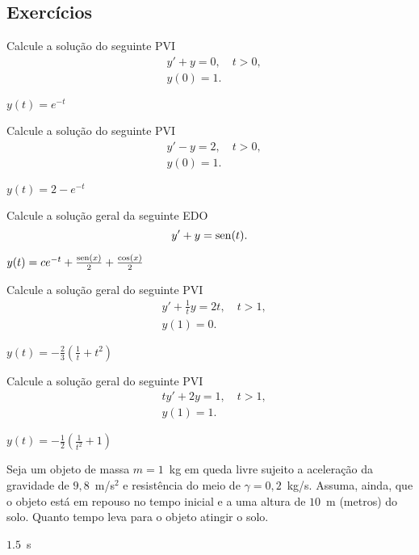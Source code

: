 \subsection*{Exercícios}

\begin{exer}
  Calcule a solução do seguinte PVI
  \begin{align}
    &y' + y = 0, \quad t>0, \\
    &y(0) = 1.    
  \end{align}
\end{exer}
\begin{resp}
  $y(t) = e^{-t}$
\end{resp}

\begin{exer}
  Calcule a solução do seguinte PVI
  \begin{align}
    &y' - y = 2, \quad t>0, \\
    &y(0) = 1.    
  \end{align}
\end{exer}
\begin{resp}
  $y(t) = 2 - e^{-t}$
\end{resp}

\begin{exer}
  Calcule a solução geral da seguinte EDO
  \begin{equation}
    y' + y = \operatorname{sen}(t).
  \end{equation}
\end{exer}
\begin{resp}
  $y(t) = ce^{-t} + \frac{\operatorname{sen}(x)}{2} + \frac{\cos(x)}{2}$
\end{resp}

\begin{exer}
  Calcule a solução geral do seguinte PVI
  \begin{align}
    &y' + \frac{1}{t}y = 2t,\quad t>1,\\
    &y(1) = 0.
  \end{align}
\end{exer}
\begin{resp}
  $y(t) = -\frac{2}{3}\left(\frac{1}{t} + t^2\right)$
\end{resp}

\begin{exer}
  Calcule a solução geral do seguinte PVI
  \begin{align}
    &ty' + 2y = 1,\quad t>1,\\
    &y(1) = 1.
  \end{align}
\end{exer}
\begin{resp}
  $y(t) = -\frac{1}{2}\left(\frac{1}{t^2} + 1\right)$
\end{resp}

\begin{exer}
  Seja um objeto de massa $m = 1$~kg em queda livre sujeito a aceleração da gravidade de $9,8$~m/s$^2$ e resistência do meio de $\gamma = 0,2$~kg/s. Assuma, ainda, que o objeto está em repouso no tempo inicial e a uma altura de $10$~m (metros) do solo. Quanto tempo leva para o objeto atingir o solo.
\end{exer}
\begin{resp}
  $1.5$~s
\end{resp}

